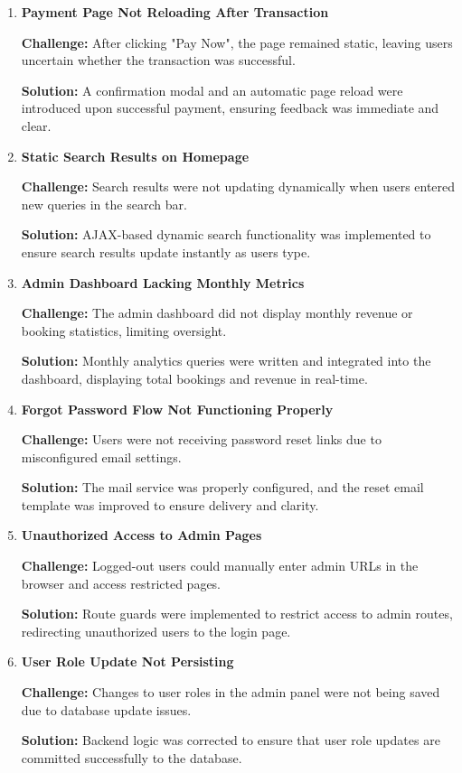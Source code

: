 \begin{enumerate}
    \item \textbf{Payment Page Not Reloading After Transaction}
    
    \textbf{Challenge:} After clicking "Pay Now", the page remained static, leaving users uncertain whether the transaction was successful.

    \textbf{Solution:} A confirmation modal and an automatic page reload were introduced upon successful payment, ensuring feedback was immediate and clear.

    \item \textbf{Static Search Results on Homepage}
    
    \textbf{Challenge:} Search results were not updating dynamically when users entered new queries in the search bar.

    \textbf{Solution:} AJAX-based dynamic search functionality was implemented to ensure search results update instantly as users type.

    \item \textbf{Admin Dashboard Lacking Monthly Metrics}
    
    \textbf{Challenge:} The admin dashboard did not display monthly revenue or booking statistics, limiting oversight.

    \textbf{Solution:} Monthly analytics queries were written and integrated into the dashboard, displaying total bookings and revenue in real-time.

    \item \textbf{Forgot Password Flow Not Functioning Properly}
    
    \textbf{Challenge:} Users were not receiving password reset links due to misconfigured email settings.

    \textbf{Solution:} The mail service was properly configured, and the reset email template was improved to ensure delivery and clarity.

    \item \textbf{Unauthorized Access to Admin Pages}
    
    \textbf{Challenge:} Logged-out users could manually enter admin URLs in the browser and access restricted pages.

    \textbf{Solution:} Route guards were implemented to restrict access to admin routes, redirecting unauthorized users to the login page.

    \item \textbf{User Role Update Not Persisting}
    
    \textbf{Challenge:} Changes to user roles in the admin panel were not being saved due to database update issues.

    \textbf{Solution:} Backend logic was corrected to ensure that user role updates are committed successfully to the database.

\end{enumerate}

